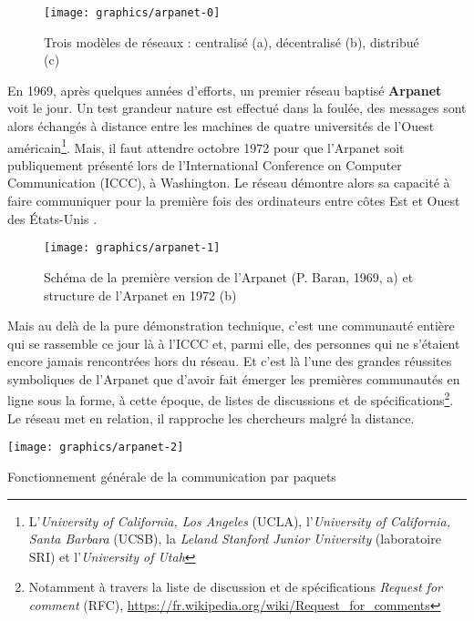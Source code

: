 \documentclass[symmetric,justified,marginals=raggedouter]{tufte-book}
\begin{document}
\begin{figure*}
  \texttt{[image: graphics/arpanet-0]}
  \caption{Trois modèles de réseaux : centralisé (a), décentralisé (b), distribué (c)}
  \label{fig:arpanet-0}
\end{figure*} 

\noindent En 1969, après quelques années d'efforts, un premier réseau baptisé \textbf{Arpanet} voit le jour. Un test grandeur nature est effectué dans la foulée, des messages sont alors échangés à distance entre les machines de quatre universités de l'Ouest américain\footnote{\RaggedOuter L'\textit{University of California, Los Angeles} (UCLA), l'\textit{University of California, Santa Barbara} (UCSB), la \textit{Leland Stanford Junior University} (laboratoire SRI) et l'\textit{University of Utah}}. Mais, il faut attendre octobre 1972 pour que l'Arpanet soit publiquement présenté lors de l'International Conference on Computer Communication (ICCC), à Washington. Le réseau démontre alors sa capacité à faire communiquer pour la première fois des ordinateurs entre côtes Est et Ouest des États-Unis \citep[p.175-186]{hafner_where_1998}.

\begin{figure*}
  \texttt{[image: graphics/arpanet-1]}
  \caption{Schéma de la première version de l'Arpanet (P. Baran, 1969, a) et structure de l'Arpanet en 1972 (b)}
  \label{fig:arpanet-1}
\end{figure*} 

\noindent Mais au delà de la pure démonstration technique, c'est une communauté entière qui se rassemble ce jour là à l'ICCC et, parmi elle, des personnes qui ne s'étaient encore jamais rencontrées hors du réseau. Et c'est là l'une des grandes réussites symboliques de l'Arpanet que d'avoir fait émerger les premières communautés en ligne sous la forme, à cette époque, de listes de discussions et de spécifications\footnote{\RaggedOuter Notamment à travers la liste de discussion et de spécifications \textit{Request for comment} (RFC), \url{https://fr.wikipedia.org/wiki/Request\_for\_comments}}. Le réseau met en relation, il rapproche les chercheurs malgré la distance. 

\newpage 

\begin{marginfigure}%
  \texttt{[image: graphics/arpanet-2]}
  \vspace*{0.2cm}  
  \caption{Fonctionnement générale de la communication par paquets}
  \label{fig:arpanet-2}
\end{marginfigure} 
\end{document}

